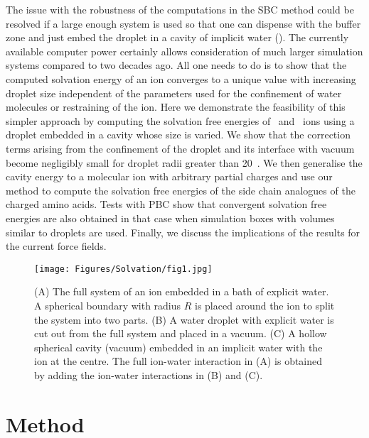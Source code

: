 The issue with the robustness of the computations in the SBC method could be resolved if a large enough 
system is used so that one can dispense with the buffer zone and just embed the droplet in a cavity 
of implicit water (). The currently available computer power certainly allows 
consideration of much larger simulation systems compared to two decades ago. All one needs to do is 
to show that the computed solvation energy of an ion converges to a unique value with increasing droplet 
size independent of the parameters used for the confinement of water molecules or restraining of the ion. 
Here we demonstrate the feasibility of this simpler approach by computing the solvation free energies 
of \Na\ and \Cl\ ions using a droplet embedded in a cavity whose size is varied. We show that the 
correction terms arising from the confinement of the droplet and its interface with vacuum become 
negligibly small for droplet radii greater than 20~\angs. We then generalise the cavity energy to a 
molecular ion with arbitrary partial charges and use our method to compute the solvation free energies 
of the side chain analogues of the charged amino acids. Tests with PBC show that convergent solvation 
free energies are also obtained in that case when simulation boxes with volumes similar to droplets 
are used. Finally, we discuss the implications of the results for the current force fields.

\begin{figure}[t!]
\texttt{[image: Figures/Solvation/fig1.jpg]} 
\caption{(A) The full system of an ion embedded in a bath of explicit water. A 
         spherical boundary with radius $R$ is placed around the ion to split the 
         system into two parts. (B) A water droplet with explicit water is cut 
         out from the full system and placed in a vacuum. (C) A hollow spherical 
         cavity (vacuum) embedded in an implicit water with the ion at the centre. 
         The full ion-water interaction in (A) is obtained by adding the ion-water 
         interactions in (B) and (C).} 
\label{solv:fig1}
\end{figure}

\section{Method}
